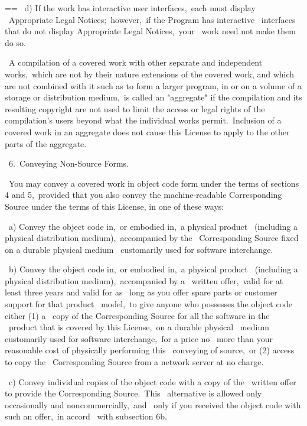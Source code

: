 \documentclass{book}
\makeatletter
\newenvironment{Texinfopreformatted}{%
  \par\GNUTobeylines\obeyspaces\frenchspacing\parskip=\z@\parindent=\z@}{}
{\catcode`\^^M=13 \gdef\GNUTobeylines{\catcode`\^^M=13 \def^^M{\null\par}}}
\newenvironment{Texinfoindented}{\begin{list}{}{}\item\relax}{\end{list}}
\renewcommand{\_}{\Texinfounderscore\discretionary{}{}{}}
\makeatother
\begin{document}
\begin{Texinfoindented}
\begin{Texinfopreformatted}
\    d) If the work has interactive user interfaces,\ each must display
\    Appropriate Legal Notices;\ however,\ if the Program has interactive
\    interfaces that do not display Appropriate Legal Notices,\ your
\    work need not make them do so.

\  A compilation of a covered work with other separate and independent
works,\ which are not by their nature extensions of the covered work,
and which are not combined with it such as to form a larger program,
in or on a volume of a storage or distribution medium,\ is called an
"aggregate" if the compilation and its resulting copyright are not
used to limit the access or legal rights of the compilation's users
beyond what the individual works permit.\  Inclusion of a covered work
in an aggregate does not cause this License to apply to the other
parts of the aggregate.

\  6.\ Conveying Non-Source Forms.

\  You may convey a covered work in object code form under the terms
of sections 4 and 5,\ provided that you also convey the
machine-readable Corresponding Source under the terms of this License,
in one of these ways:

\    a) Convey the object code in,\ or embodied in,\ a physical product
\    (including a physical distribution medium),\ accompanied by the
\    Corresponding Source fixed on a durable physical medium
\    customarily used for software interchange.

\    b) Convey the object code in,\ or embodied in,\ a physical product
\    (including a physical distribution medium),\ accompanied by a
\    written offer,\ valid for at least three years and valid for as
\    long as you offer spare parts or customer support for that product
\    model,\ to give anyone who possesses the object code either (1) a
\    copy of the Corresponding Source for all the software in the
\    product that is covered by this License,\ on a durable physical
\    medium customarily used for software interchange,\ for a price no
\    more than your reasonable cost of physically performing this
\    conveying of source,\ or (2) access to copy the
\    Corresponding Source from a network server at no charge.

\    c) Convey individual copies of the object code with a copy of the
\    written offer to provide the Corresponding Source.\  This
\    alternative is allowed only occasionally and noncommercially,\ and
\    only if you received the object code with such an offer,\ in accord
\    with subsection 6b.


\end{Texinfopreformatted}
\end{Texinfoindented}
\end{document}
